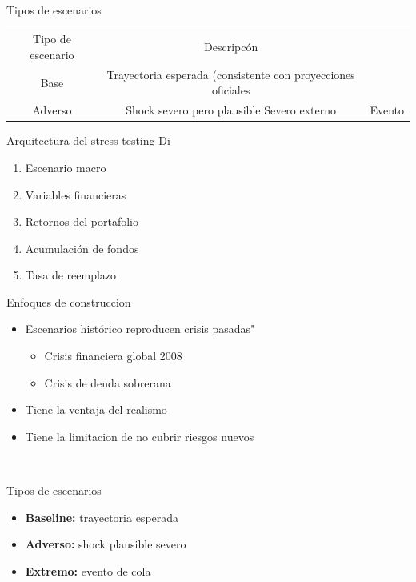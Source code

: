\documentclass{beamer}
\begin{document}
\begin{frame}{Tipos de escenarios}
\begin{tabular}{c|c}
     Tipo de escenario  &  Descripc\'on \\
     Base               & Trayectoria esperada (consistente con proyecciones oficiales \\
     Adverso            & Shock severo pero plausible
     Severo externo     & Evento                                                                                                      
\end{tabular}
    
\end{frame}
\begin{frame}{Arquitectura del stress testing}
\centering
Di

\begin{enumerate}
\item Escenario macro
\item Variables financieras
\item Retornos del portafolio
\item Acumulación de fondos
\item Tasa de reemplazo
\end{enumerate}
\end{frame}

\begin{frame}{Enfoques de construccion}
\begin{itemize}
    \item Escenarios hist\'orico reproducen crisis pasadas"
    \begin{itemize}
        \item Crisis financiera global 2008
        \item  Crisis de deuda sobrerana
    \end{itemize}
    \item Tiene la ventaja del realismo
    \item Tiene la limitacion de no cubrir riesgos nuevos
    
\end{itemize}
\
    
\end{frame}


\begin{frame}{Tipos de escenarios}
\begin{itemize}
\item \textbf{Baseline:} trayectoria esperada
\item \textbf{Adverso:} shock plausible severo
\item \textbf{Extremo:} evento de cola
\end{itemize}
\end{frame}
\end{document}
